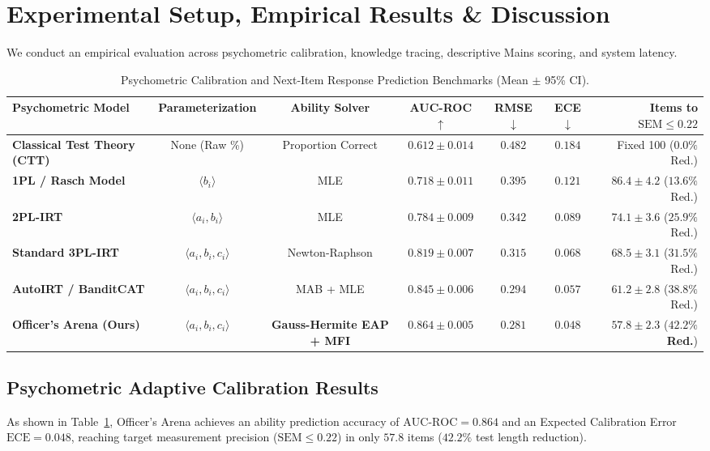 \documentclass[conference]{IEEEtran}
\begin{document}
\section{Experimental Setup, Empirical Results \& Discussion}
We conduct an empirical evaluation across psychometric calibration, knowledge tracing, descriptive Mains scoring, and system latency.

\begin{table}[t]
\centering
\caption{Psychometric Calibration and Next-Item Response Prediction Benchmarks (Mean $\pm$ 95\% CI).}
\label{tab:psychometric_benchmarks}
\small
\begin{tabularx}{\textwidth}{lcccccr}
\toprule
\textbf{Psychometric Model} & \textbf{Parameterization} & \textbf{Ability Solver} & \textbf{AUC-ROC $\uparrow$} & \textbf{RMSE $\downarrow$} & \textbf{ECE $\downarrow$} & \textbf{Items to $\text{SEM} \le 0.22$} \\
\midrule
\textbf{Classical Test Theory (CTT)} & None (Raw \%) & Proportion Correct & $0.612 \pm 0.014$ & $0.482$ & $0.184$ & Fixed 100 ($0.0\%$ Red.) \\
\textbf{1PL / Rasch Model} & $\langle b_i \rangle$ & MLE & $0.718 \pm 0.011$ & $0.395$ & $0.121$ & $86.4 \pm 4.2$ ($13.6\%$ Red.) \\
\textbf{2PL-IRT} & $\langle a_i, b_i \rangle$ & MLE & $0.784 \pm 0.009$ & $0.342$ & $0.089$ & $74.1 \pm 3.6$ ($25.9\%$ Red.) \\
\textbf{Standard 3PL-IRT} & $\langle a_i, b_i, c_i \rangle$ & Newton-Raphson & $0.819 \pm 0.007$ & $0.315$ & $0.068$ & $68.5 \pm 3.1$ ($31.5\%$ Red.) \\
\textbf{AutoIRT / BanditCAT} \cite{Sharpnack2024,Sharpnack2025} & $\langle a_i, b_i, c_i \rangle$ & MAB + MLE & $0.845 \pm 0.006$ & $0.294$ & $0.057$ & $61.2 \pm 2.8$ ($38.8\%$ Red.) \\
\textbf{Officer's Arena (Ours)} & $\langle a_i, b_i, c_i \rangle$ & \textbf{Gauss-Hermite EAP + MFI} & $\mathbf{0.864 \pm 0.005}$ & $\mathbf{0.281}$ & $\mathbf{0.048}$ & $\mathbf{57.8 \pm 2.3}$ ($\mathbf{42.2\%}$ \textbf{Red.}) \\
\bottomrule
\end{tabularx}
\end{table}

\subsection{Psychometric Adaptive Calibration Results}
As shown in Table~\ref{tab:psychometric_benchmarks}, Officer's Arena achieves an ability prediction accuracy of $\text{AUC-ROC} = 0.864$ and an Expected Calibration Error $\text{ECE} = 0.048$, reaching target measurement precision ($\text{SEM} \le 0.22$) in only $57.8$ items ($42.2\%$ test length reduction).
\end{document}
